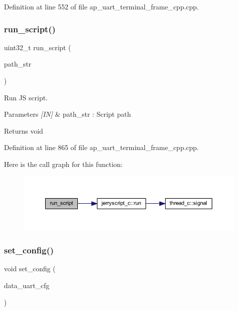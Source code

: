 Definition at line 552 of file ap\+\_\+uart\+\_\+terminal\+\_\+frame\+\_\+cpp.\+cpp.

\mbox{\label{group___u_a_r_t__terminal_ga5ad6770a94d4fba50b27ae366ba4580d}} 
\subsubsection{run\_script()}
{\footnotesize\ttfamily uint32\+\_\+t run\+\_\+script (\begin{DoxyParamCaption}\item[{wx\+String}]{path\+\_\+str }\end{DoxyParamCaption})}



Run JS script. 


\begin{DoxyParams}{Parameters}
{\em \mbox{[}\+I\+N\mbox{]}} & path\+\_\+str \+: Script path \\
\hline
\end{DoxyParams}
\begin{DoxyReturn}{Returns}
void 
\end{DoxyReturn}


Definition at line 865 of file ap\+\_\+uart\+\_\+terminal\+\_\+frame\+\_\+cpp.\+cpp.

Here is the call graph for this function\+:\nopagebreak
\begin{figure}[H]
\begin{center}
\leavevmode
\includegraphics[width=350pt]{group___u_a_r_t__terminal_ga5ad6770a94d4fba50b27ae366ba4580d_cgraph}
\end{center}
\end{figure}
\mbox{\label{group___u_a_r_t__terminal_ga658464cfaff2e47e321ffa1f5245f350}} 
\subsubsection{set\_config()}
{\footnotesize\ttfamily void set\+\_\+config (\begin{DoxyParamCaption}\item[{\textbf{ uart\+\_\+cfg\+\_\+t}}]{data\+\_\+uart\+\_\+cfg }\end{DoxyParamCaption})}



